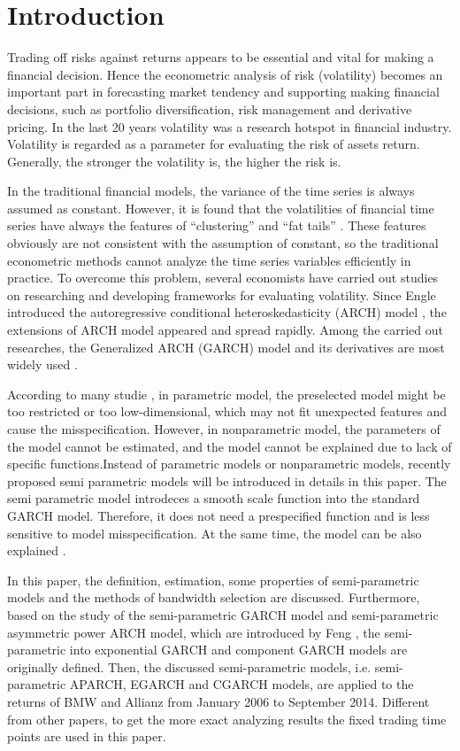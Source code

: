 \chapter{Introduction}\label{secIntroduction}
Trading off risks against returns appears to be essential and vital for making a financial decision. Hence the econometric analysis of risk (volatility) becomes an important part in forecasting market tendency and supporting making financial decisions, such as portfolio diversification, risk management and derivative pricing. In the last 20 years volatility was a research hotspot in financial industry. Volatility is regarded as a parameter for evaluating the risk of assets return. Generally, the stronger the volatility is, the higher the risk is.

In the traditional financial models, the variance of the time series is always assumed as constant. However, it is found that the volatilities of financial time series have always the features of ``clustering'' and ``fat tails''  \citep{Mandelbrot1963,EugeneF.Fama1965}. These features obviously are not consistent with the assumption of constant, so the traditional econometric methods cannot analyze the time series variables efficiently in practice. To overcome this problem, several economists have carried out studies on researching and developing frameworks for evaluating volatility. Since Engle introduced the autoregressive conditional heteroskedasticity (ARCH) model \citep{Engle1982}, the extensions of ARCH model appeared and spread rapidly. Among the carried out researches, the Generalized ARCH (GARCH) model and its derivatives are most widely used \citep{Bollerslev1986}.

 According to many studie \citep{Gourieroux1992,Eubank1993}, in parametric model, the preselected model might be too restricted or too low-dimensional, which may not fit unexpected features and cause the misspecification. However, in nonparametric model, the parameters of the model cannot be estimated, and the model cannot be explained due to lack of specific functions.Instead of parametric models or nonparametric models, recently proposed semi parametric models will be introduced in details in this paper. The semi parametric model introdeces a smooth scale function into the standard GARCH model. Therefore, it does not need a prespecified function and is less sensitive to model misspecification. At the same time, the model can be also explained \citep{Di2011}.

In this paper, the definition, estimation, some properties of semi-parametric models and the methods of bandwidth selection are discussed. Furthermore, based on the study of the semi-parametric GARCH model and semi-parametric asymmetric power ARCH model, which are introduced by Feng \citep{Feng2004,FengYuanhua;Sun2013}, the semi-parametric  into exponential GARCH and component GARCH models are originally defined. Then, the discussed semi-parametric models, i.e. semi-parametric APARCH, EGARCH and CGARCH models, are applied to the returns of BMW and Allianz from January 2006 to September 2014. Different from other papers, to get the more exact analyzing results the fixed trading time points are used in this paper.

